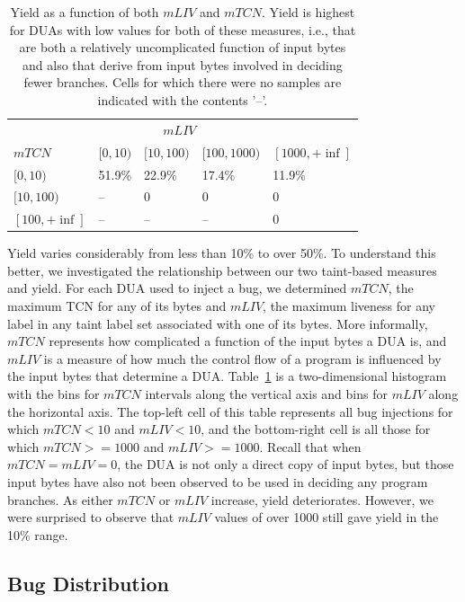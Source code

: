 \begin{table}[b]
\centering
\begin{tabular}{l|l|l|l|l} 
       & \multicolumn{3}{c}{$mLIV$} &  \\  
$mTCN$ &         $[0,10)$ & $[10,100)$ & $[100,1000)$ & $[1000,+\inf]$ \\  \hline 
$[0,10)$ &       51.9\%   & 22.9\%     & 17.4\%       & 11.9\%          \\
$[10,100)$ &     --       & 0          & 0            & 0     \\
$[100,+\inf]$ &  --       & --         & --           & 0     \\ 
\end{tabular}
\caption{Yield as a function of both $mLIV$ and $mTCN$.  
Yield is highest for DUAs with low values for both of these measures, i.e., that are both a relatively uncomplicated function of input bytes and also that derive from input bytes involved in deciding fewer branches.
Cells for which there were no samples are indicated with the contents '--'.}
\label{table:yield-breakdown}
\end{table}

Yield varies considerably from less than 10\% to over 50\%.
To understand this better, we investigated the relationship between our two taint-based measures and yield.
For each DUA used to inject a bug, we determined $mTCN$, the maximum TCN for any of its bytes and $mLIV$, the maximum liveness for any label in any taint label set associated with one of its bytes.  
More informally, $mTCN$ represents how complicated a function of the input bytes a DUA is, and $mLIV$ is a measure of how much the control flow of a program is influenced by the input bytes that determine a DUA.
Table~\ref{table:yield-breakdown} is a two-dimensional histogram with the bins for $mTCN$ intervals along the vertical axis and bins for $mLIV$ along the horizontal axis.
The top-left cell of this table represents all bug injections for which $mTCN<10$ and $mLIV<10$, and the bottom-right cell is all those for which $mTCN>=1000$ and $mLIV>=1000$.
Recall that when  $mTCN=mLIV=0$, the DUA is not only a direct copy of input bytes, but those input bytes have also not been observed to be used in deciding any program branches. 
As either $mTCN$ or $mLIV$ increase, yield deteriorates.  
However, we were surprised to observe that $mLIV$ values of over 1000 still gave yield in the 10\% range.

\subsection{Bug Distribution}

